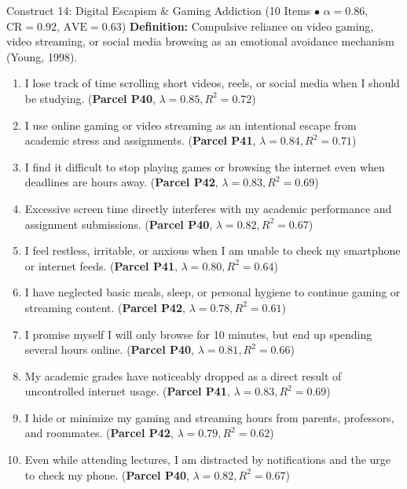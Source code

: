 \documentclass[10pt,a4paper]{article}
\begin{document}
\vspace{0.2cm}
\begin{constructbox}{Construct 14: Digital Escapism \& Gaming Addiction (10 Items $\bullet$ $\alpha = 0.86$, $\text{CR} = 0.92$, $\text{AVE} = 0.63$)}
\textbf{Definition:} Compulsive reliance on video gaming, video streaming, or social media browsing as an emotional avoidance mechanism (Young, 1998).
\begin{enumerate}[label=\textbf{Q\arabic*.}, leftmargin=2.5em, itemsep=2pt, resume]
  \item I lose track of time scrolling short videos, reels, or social media when I should be studying. \hfill (\textbf{Parcel P40}, $\lambda = 0.85, R^2 = 0.72$)
  \item I use online gaming or video streaming as an intentional escape from academic stress and assignments. \hfill (\textbf{Parcel P41}, $\lambda = 0.84, R^2 = 0.71$)
  \item I find it difficult to stop playing games or browsing the internet even when deadlines are hours away. \hfill (\textbf{Parcel P42}, $\lambda = 0.83, R^2 = 0.69$)
  \item Excessive screen time directly interferes with my academic performance and assignment submissions. \hfill (\textbf{Parcel P40}, $\lambda = 0.82, R^2 = 0.67$)
  \item I feel restless, irritable, or anxious when I am unable to check my smartphone or internet feeds. \hfill (\textbf{Parcel P41}, $\lambda = 0.80, R^2 = 0.64$)
  \item I have neglected basic meals, sleep, or personal hygiene to continue gaming or streaming content. \hfill (\textbf{Parcel P42}, $\lambda = 0.78, R^2 = 0.61$)
  \item I promise myself I will only browse for 10 minutes, but end up spending several hours online. \hfill (\textbf{Parcel P40}, $\lambda = 0.81, R^2 = 0.66$)
  \item My academic grades have noticeably dropped as a direct result of uncontrolled internet usage. \hfill (\textbf{Parcel P41}, $\lambda = 0.83, R^2 = 0.69$)
  \item I hide or minimize my gaming and streaming hours from parents, professors, and roommates. \hfill (\textbf{Parcel P42}, $\lambda = 0.79, R^2 = 0.62$)
  \item Even while attending lectures, I am distracted by notifications and the urge to check my phone. \hfill (\textbf{Parcel P40}, $\lambda = 0.82, R^2 = 0.67$)
\end{enumerate}
\end{constructbox}
\end{document}
